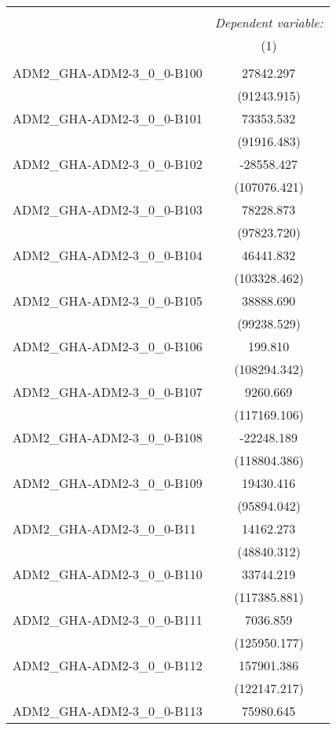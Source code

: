 \begin{table}[!htbp] \centering
\begin{tabular}{@{\extracolsep{5pt}}lc}
\\[-1.8ex]\hline
\hline \\[-1.8ex]
& \multicolumn{1}{c}{\textit{Dependent variable:}} \
\cr \cline{1-2}
\\[-1.8ex] & (1) \\
\hline \\[-1.8ex]
 ADM2_GHA-ADM2-3_0_0-B100 & 27842.297$^{}$ \\
  & (91243.915) \\
 ADM2_GHA-ADM2-3_0_0-B101 & 73353.532$^{}$ \\
  & (91916.483) \\
 ADM2_GHA-ADM2-3_0_0-B102 & -28558.427$^{}$ \\
  & (107076.421) \\
 ADM2_GHA-ADM2-3_0_0-B103 & 78228.873$^{}$ \\
  & (97823.720) \\
 ADM2_GHA-ADM2-3_0_0-B104 & 46441.832$^{}$ \\
  & (103328.462) \\
 ADM2_GHA-ADM2-3_0_0-B105 & 38888.690$^{}$ \\
  & (99238.529) \\
 ADM2_GHA-ADM2-3_0_0-B106 & 199.810$^{}$ \\
  & (108294.342) \\
 ADM2_GHA-ADM2-3_0_0-B107 & 9260.669$^{}$ \\
  & (117169.106) \\
 ADM2_GHA-ADM2-3_0_0-B108 & -22248.189$^{}$ \\
  & (118804.386) \\
 ADM2_GHA-ADM2-3_0_0-B109 & 19430.416$^{}$ \\
  & (95894.042) \\
 ADM2_GHA-ADM2-3_0_0-B11 & 14162.273$^{}$ \\
  & (48840.312) \\
 ADM2_GHA-ADM2-3_0_0-B110 & 33744.219$^{}$ \\
  & (117385.881) \\
 ADM2_GHA-ADM2-3_0_0-B111 & 7036.859$^{}$ \\
  & (125950.177) \\
 ADM2_GHA-ADM2-3_0_0-B112 & 157901.386$^{}$ \\
  & (122147.217) \\
 ADM2_GHA-ADM2-3_0_0-B113 & 75980.645$^{}$ \\

\end{tabular}
\end{table}
